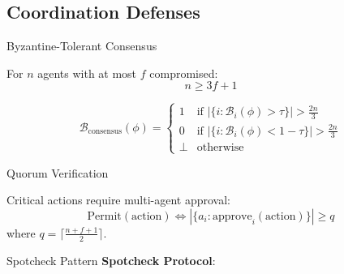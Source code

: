 \documentclass[
  ignorenonframetext,
]{beamer}
\begin{document}
\subsection{Coordination Defenses}\label{sec:coord-defenses}

\begin{frame}[allowframebreaks]{Byzantine-Tolerant Consensus}
\protect{}\label{byzantine-tolerant-consensus}
\begin{theorem}
\label{thm:byzantine-req}
For $n$ agents with at most $f$ compromised:
\begin{equation}
\label{eq:byzantine-req}
n \geq 3f + 1
\end{equation}
\end{theorem}

\begin{definition}
\label{def:cog-byzantine}
\begin{equation}
\label{eq:cog-byzantine}
\mathcal{B}_{\text{consensus}}(\phi) = \begin{cases}
1 & \text{if } |\{i: \mathcal{B}_i(\phi) > \tau\}| > \frac{2n}{3} \\
0 & \text{if } |\{i: \mathcal{B}_i(\phi) < 1-\tau\}| > \frac{2n}{3} \\
\perp & \text{otherwise}
\end{cases}
\end{equation}
\end{definition}
\end{frame}

\begin{frame}[allowframebreaks]{Quorum Verification}
\protect{}\label{quorum-verification}
\begin{definition}
\label{def:quorum}
Critical actions require multi-agent approval:
\begin{equation}
\label{eq:quorum}
\text{Permit}(\text{action}) \iff |\{a_i: \text{approve}_i(\text{action})\}| \geq q
\end{equation}
where $q = \lceil \frac{n + f + 1}{2} \rceil$.
\end{definition}
\end{frame}

\begin{frame}[allowframebreaks]{Spotcheck Pattern}
\protect{}\label{spotcheck-pattern}
\textbf{Spotcheck Protocol}:

\end{frame}
\end{document}
